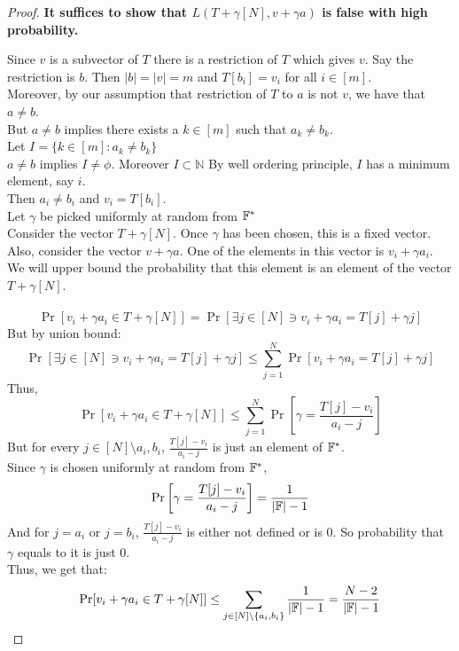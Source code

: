 \begin{proof}
    \textbf{It suffices to show that $L(T+\gamma[N], v+\gamma a)$ is false with high probability.}

    Since $v$ is a subvector of $T$ there is a restriction of $T$ which gives $v$. Say the restriction is $b$. Then $|b|=|v|=m$ and $T[b_i]=v_i$ for all $i \in [m]$. \\
    Moreover, by our assumption that restriction of $T$ to $a$ is not $v$, we have that $a \neq b$. \\
    But $a\neq b$ implies there exists a $k \in [m]$ such that $a_k\neq b_k$.\\
    Let $I=\{k \in [m]:a_k\neq b_k\}$\\
    $a \neq b$ implies $I\neq \phi$. Moreover $I \subset \mathbb{N}$
    By well ordering principle, $I$ has a minimum element, say $i$. \\
    Then $a_i \neq b_i$ and $v_i=T[b_i]$. \\
    Let $\gamma$ be picked uniformly at random from $\mathbb{F}^*$\\
    Consider the vector $T+\gamma[N]$. Once $\gamma$ has been chosen, this is a fixed vector. \\
    Also, consider the vector $v+\gamma a$. One of the elements in this vector is $v_i +\gamma a_i$.\\
    We will upper bound the probability that this element is an element of the vector $T+\gamma[N]$. \\\\
    $$\Pr[v_i +\gamma a_i \in T+\gamma[N]]=\Pr[\exists j \in [N] \ni v_i +\gamma a_i=T[j]+\gamma j]$$
    But by union bound:
    $$\Pr[\exists j \in [N] \ni v_i +\gamma a_i=T[j]+\gamma j] \leq \sum_{j=1}^N \Pr[v_i +\gamma a_i=T[j]+\gamma j]$$
    Thus,
    $$\Pr[v_i +\gamma a_i \in T+\gamma[N]] \leq \sum_{j=1}^N \Pr\left[\gamma = \frac{T[j]-v_i}{a_i-j}\right] $$
    But for every $j \in [N]\setminus{a_i, b_i}$, $\frac{T[j]-v_i}{a_i-j}$ is just an element of $\mathbb{F}^{*}$. \\
    Since $\gamma$ is chosen uniformly at random from $\mathbb{F}^{*}$,
    $$\Pr\left[\gamma = \frac{T[j]-v_i}{a_i-j}\right]=\frac{1}{|\mathbb{F}|-1}$$
    And for $j=a_i$ or $j=b_i$, $\frac{T[j]-v_i}{a_i-j}$ is either not defined or is $0$. So probability that $\gamma$ equals to it is just $0$.\\
    Thus, we get that:
    $$\Pr[v_i +\gamma a_i \in T+\gamma[N]] \leq \sum_{j \in [N]\setminus \{a_i, b_i\}} \frac{1}{|\mathbb{F}|-1} =\frac{N-2}{|\mathbb{F}|-1}$$


\end{proof}
